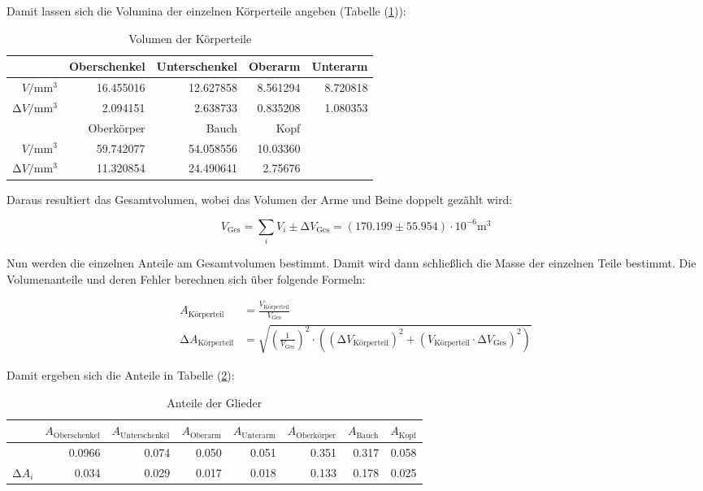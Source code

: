 Damit lassen sich die Volumina der einzelnen Körperteile angeben (Tabelle (\ref{tab:VolGlieder})):

\begin{table}[H]
  \centering
  \caption{Volumen der Körperteile}
  \label{tab:VolGlieder}
  \begin{tabular}{rrrrr}
    \toprule
    & Oberschenkel &     Unterschenkel &     Oberarm &     Unterarm \\
    \midrule
    $V / \unit{\milli\cubic\meter}$  & 16.455016 & 12.627858 & 8.561294 & 8.720818 \\
    $\increment V / \unit{\milli\cubic\meter}$  &   2.094151 &  2.638733 & 0.835208 & 1.080353  \\
    \midrule
    &    Oberkörper &     Bauch & Kopf & \\
    \midrule
    $V / \unit{\milli\cubic\meter}$  & 59.742077 & 54.058556 & 10.03360 & \\ 
    $\increment V / \unit{\milli\cubic\meter}$  &  11.320854 & 24.490641 & 2.75676 & \\
    \bottomrule
    \end{tabular}
\end{table}

Daraus resultiert das Gesamtvolumen, wobei das Volumen der Arme und Beine doppelt gezählt wird:

\begin{equation*}
  V_{\text{Ges}} = \sum_i V_{i} \pm  \increment V_{\text{Ges}}= (170.199 \pm 55.954) \cdot 10^{-6} \unit{\cubic\meter}
\end{equation*}

Nun werden die einzelnen Anteile am Gesamtvolumen bestimmt.
Damit wird dann schließlich die Masse der einzelnen Teile bestimmt.
Die Volumenanteile und deren Fehler berechnen sich über folgende Formeln:

\begin{align*}
  A_{\text{Körperteil}} & = \frac {V_{\text{Körperteil}}} {V_{\text{Ges}}} \\
  \increment A_{\text{Körperteil}} & = \sqrt{\left(\frac{1}{V_{\text{Ges}}}\right)^2 
  \cdot \left(\left( \increment V_{\text{Körperteil}} \right)^2 + \left( V_{\text{Körperteil}} 
  \cdot \increment V_{\text{Ges}} \right)^2\right)}
\end{align*}

Damit ergeben sich die Anteile in Tabelle (\ref{tab:AnteileKörper}):

\begin{table}
  \centering
  \caption{Anteile der Glieder}
  \label{tab:AnteileKörper}
  \begin{tabular}{rrrrrrrr}
    \toprule
      & $A_{\text{Oberschenkel}}$ &     $A_{\text{Unterschenkel}}$ &     $A_{\text{Oberarm}}$ &     $A_{\text{Unterarm}}$    &    $A_{\text{Oberkörper}}$ &     $A_{\text{Bauch}}$ & $A_{\text{Kopf}}$ \\
    \midrule
    & 0.0966 & 0.074 & 0.050 & 0.051 & 0.351 & 0.317 & 0.058 \\
    $\increment A_i$ & 0.034 & 0.029 & 0.017 & 0.018 & 0.133 & 0.178 & 0.025 \\
    \bottomrule
  \end{tabular}
\end{table}

